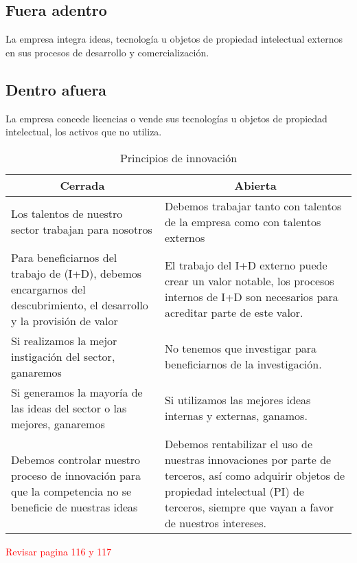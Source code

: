 \documentclass[11pt]{book}
\begin{document}
\subsection{Fuera adentro}
La empresa integra ideas, tecnología u objetos de propiedad intelectual externos en sus procesos de desarrollo y comercialización. 
\subsection{Dentro afuera}
La empresa concede licencias o vende sus tecnologías u objetos de propiedad intelectual, los activos que no utiliza.
\begin{table}[htbp]
  \centering
  \caption{Principios de innovación}
  \vspace{1cm}
    \begin{tabular}{p{17.5em}|p{17.5em}}
    \multicolumn{1}{c}{\textcolor[rgb]{ .267,  .329,  .416}{\textbf{Cerrada}}} & \multicolumn{1}{c}{\textcolor[rgb]{ .267,  .329,  .416}{\textbf{Abierta}}} \\
\midrule
    Los talentos de nuestro sector trabajan para nosotros & Debemos trabajar tanto con talentos de la empresa como con talentos externos  \\
    \midrule
    Para beneficiarnos del trabajo de (I+D), debemos encargarnos del descubrimiento, el desarrollo y la provisión de valor & El trabajo del I+D externo puede crear un valor notable, los procesos internos de I+D son necesarios para acreditar parte de este valor. \\
    \midrule
    Si realizamos la mejor instigación del sector, ganaremos & No tenemos que investigar para beneficiarnos de la investigación. \\
    \midrule
    Si generamos la mayoría de las ideas del sector o las mejores, ganaremos & Si utilizamos las mejores ideas internas y externas, ganamos. \\
    \midrule
    Debemos controlar nuestro proceso de innovación para que la competencia no se beneficie de nuestras ideas & Debemos rentabilizar el uso de nuestras innovaciones por parte de terceros, así como adquirir objetos de propiedad intelectual (PI) de terceros, siempre que vayan a favor de nuestros intereses. \\
    \end{tabular}%
  \label{tab:addlabel}%
\end{table}%
\begin{flushright}
\textcolor{red}{Revisar pagina 116 y 117}
\end{flushright} 
\end{document}
